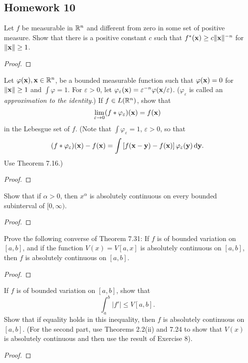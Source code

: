 \subsection{Homework 10}
\begin{problem}
Let $f$ be measurable in $\mathbb{R}^n$ and different from zero in some set of
positive measure. Show that there is a positive constant $c$ such that
$f^*(\mathbf{x})\geq c\|\mathbf{x}\|^{-n}$ for $\|\mathbf{x}\|\geq 1$.
\end{problem}
\begin{proof}
\end{proof}

\begin{problem}
Let $\varphi(\mathbf{x}),\mathbf{x}\in\mathbb{R}^n$, be a bounded measurable function such
that $\varphi(\mathbf{x})=0$ for $\|\mathbf{x}\|\geq 1$ and $\int\varphi=1$. For
$\varepsilon>0$, let
$\varphi_\varepsilon(\mathbf{x})=\varepsilon^{-n}\varphi(\mathbf{x}/\varepsilon)$. ($\varphi_\varepsilon$
is called an \emph{approximation to the identity}.) If $f\in L(\mathbb{R}^n)$,
show that
\[
\lim_{\varepsilon\to 0}(f*\varphi_\varepsilon)(\mathbf{x})=f(\mathbf{x})
\]
in the Lebesgue set of $f$. (Note that $\int\varphi_\varepsilon=1$,
$\varepsilon>0$, so that
\[
(f*\varphi_\varepsilon)(\mathbf{x})-f(\mathbf{x})=\int\left[f(\mathbf{x}-\mathbf{y})-f(\mathbf{x})\right]\varphi_\varepsilon(\mathbf{y})\mathop{}\!\mathrm{d}\mathbf{y}.
\]
Use Theorem 7.16.)
\end{problem}
\begin{proof}
\end{proof}

\begin{problem}
Show that if $\alpha>0$, then $x^\alpha$ is absolutely continuous on every
bounded subinterval of $[0,\infty)$.
\end{problem}
\begin{proof}
\end{proof}

\begin{problem}
Prove the following converse of Theorem 7.31: If $f$ is of bounded
variation on $[a,b]$, and if the function $V(x)=V[a,x]$ is absolutely
continuous on $[a,b]$, then $f$ is absolutely continuous on $[a,b]$.
\end{problem}
\begin{proof}
\end{proof}

\begin{problem}
If $f$ is of bounded variation on $[a,b]$, show that
\[
\int_a^b|f'|\leq V[a,b].
\]
Show that if equality holds in this inequality, then $f$ is absolutely
continuous on $[a,b]$. (For the second part, use Theorems 2.2(ii) and 7.24
to show that $V(x)$ is absolutely continuous and then use the result of
Exercise 8).
\end{problem}
\begin{proof}
\end{proof}

